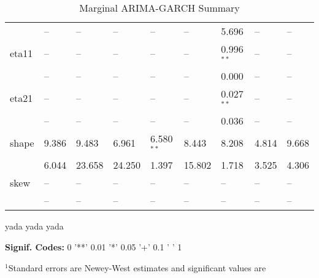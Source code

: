 \documentclass[12pt]{article}
\begin{document}
\begin{table}
\begin{tabular}{l l l l l | l l l l}
        		   &     --        &     --        &     --        &     --        &     --        &  5.696        &    --        &     --        \\
        	eta11  &     --        &     --        &     --        &     --        &     --        &  0.996$^{**}$ &    --        &     --        \\
        		   &     --        &     --        &     --        &     --        &     --        &  0.000        &    --        &     --        \\
        	eta21  &     --        &     --        &     --        &     --        &     --        &  0.027$^{**}$ &    --        &     --        \\
        		   &     --        &     --        &     --        &     --        &     --        &  0.036        &    --        &     --        \\
        	shape  &  9.386        &  9.483        &  6.961        &  6.580$^{**}$ &  8.443        &  8.208        & 4.814        &  9.668        \\
        		   &  6.044        & 23.658        & 24.250        &  1.397        & 15.802        &  1.718        & 3.525        &  4.306        \\
        	skew   &     --        &     --        &     --        &     --        &     --        &     --        &    --        &     --        \\
        		   &     --        &     --        &     --        &     --        &     --        &     --        &    --        &     --        \\
			\midrule
	\end{tabular}
	\caption{Marginal ARIMA-GARCH Summary}
	\begin{tablenotes}
		\item{\footnotesize yada yada yada}
		\item{\footnotesize \textbf{Signif. Codes:} 0 '**' 0.01 '*' 0.05 '+' 0.1 ' ' 1}
		\item{\footnotesize $^{1}$Standard errors are Newey-West estimates and significant values are } 
	\end{tablenotes}
	\label{tbl:correlation_to_log_dtw_regression}
\end{table}
\end{document}
